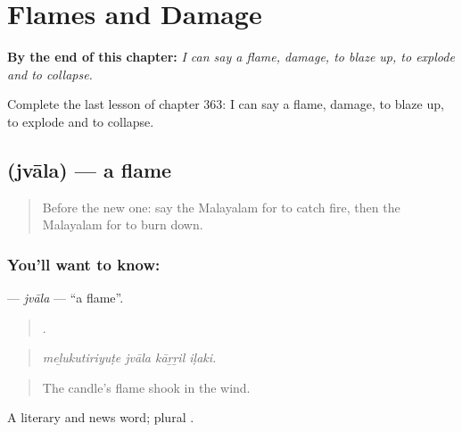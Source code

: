 
\chapter{Flames and Damage}
\label{ch:ml-flames-and-damage}

\begin{chapteropening}
\textbf{By the end of this chapter:} \emph{I can say a flame, damage, to blaze up, to explode and to collapse.}

Complete the last lesson of chapter 363: I can say a flame, damage, to blaze up, to explode and to collapse.
\end{chapteropening}

\section[\texorpdfstring{\ml{ജ്വാല} (jvāla)}{ജ്വാല (jvāla)}]{ (jvāla) — a flame}

\label{lesson:ML-C363-jvala}



\begin{quote}
Before the new one: say the Malayalam for to catch fire, then the Malayalam for to burn down.
\end{quote}

\subsection*{You'll want to know: }
\textbf{} — \emph{jvāla} — \textquotedblleft{}a flame\textquotedblright{}.

\begin{quote}
   .
\end{quote}

\begin{quote}
\emph{meḻukutiriyuṭe jvāla kāṟṟil iḷaki.}
\end{quote}

\begin{quote}
The candle's flame shook in the wind.
\end{quote}

A literary and news word; plural .


